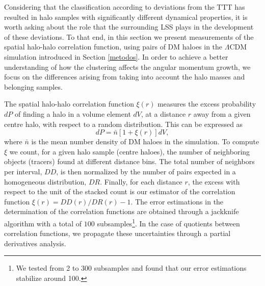 \documentclass[fleqn,usenatbib]{mnras}
\begin{document}
Considering that the classification according to deviations from the TTT has resulted in halo samples with significantly different dynamical properties, it is worth asking about the role that the surrounding LSS plays in the development of these deviations. To that end, in this section we present measurements of the spatial halo-halo correlation function, using pairs of DM haloes in the $\Lambda$CDM simulation introduced in Section \ref{metodos}. In order to achieve a better understanding of how the clustering affects the angular momentum growth, we focus on the differences arising from taking into account the halo masses and belonging samples.

The spatial halo-halo correlation function $\xi(r)$ measures the excess probability $dP$ of finding a halo in a volume element $dV$, at a distance $r$ away from a given centre halo, with respect to a random distribution. This can be expressed as
\begin{equation*}
dP=\bar{n}[1+\xi(r)]dV,
\end{equation*}
where $\bar{n}$ is the mean number density of DM haloes in the simulation. To compute $\xi$ we count, for a given halo sample (centre haloes), the number of neighboring objects (tracers) found at different distance bins. The total number of neighbors per interval, $DD$, is then normalized by the number of pairs expected in a homogeneous distribution, $DR$. Finally, for each distance $r$, the excess with respect to the unit of the stacked count is our estimator of the correlation function $\xi(r)=DD(r)/DR(r)-1$. The error estimations in the determination of the correlation functions are obtained through a jackknife algorithm with a total of $100$ subsamples\footnote{We tested from 2 to 300 subsamples and found that our error estimations stabilize around 100.}. In the case of quotients between correlation functions, we propagate these uncertainties through a partial derivatives analysis.
\end{document}
